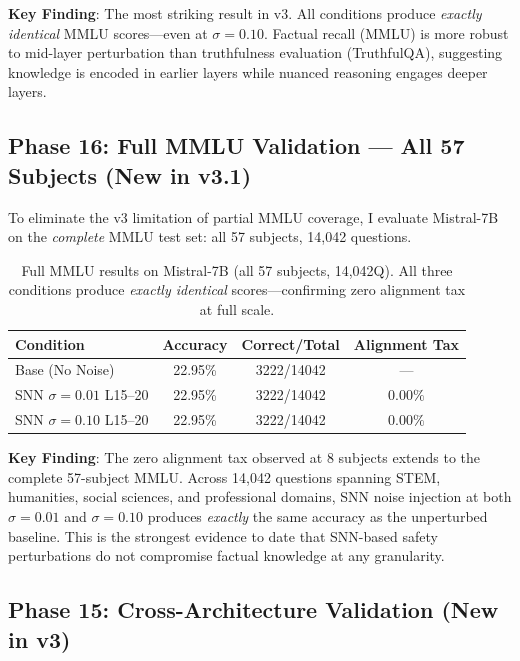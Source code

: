 \documentclass[11pt,a4paper]{article}
\begin{document}
\textbf{Key Finding}: The most striking result in v3. All conditions produce \emph{exactly identical} MMLU scores---even at $\sigma=0.10$. Factual recall (MMLU) is more robust to mid-layer perturbation than truthfulness evaluation (TruthfulQA), suggesting knowledge is encoded in earlier layers while nuanced reasoning engages deeper layers.

\subsection{Phase 16: Full MMLU Validation --- All 57 Subjects (New in v3.1)}

To eliminate the v3 limitation of partial MMLU coverage, I evaluate Mistral-7B on the \emph{complete} MMLU test set: all 57 subjects, 14,042 questions.

\begin{table}[h]
\centering
\begin{tabular}{l|ccc}
\toprule
Condition & Accuracy & Correct/Total & Alignment Tax \\
\midrule
Base (No Noise) & 22.95\% & 3222/14042 & --- \\
SNN $\sigma=0.01$ L15--20 & 22.95\% & 3222/14042 & $\mathbf{0.00\%}$ \\
SNN $\sigma=0.10$ L15--20 & 22.95\% & 3222/14042 & $\mathbf{0.00\%}$ \\
\bottomrule
\end{tabular}
\caption{Full MMLU results on Mistral-7B (all 57 subjects, 14,042Q). All three conditions produce \emph{exactly identical} scores---confirming zero alignment tax at full scale.}
\label{tab:mmlu_full}
\end{table}

\textbf{Key Finding}: The zero alignment tax observed at 8 subjects extends to the complete 57-subject MMLU. Across 14,042 questions spanning STEM, humanities, social sciences, and professional domains, SNN noise injection at both $\sigma=0.01$ and $\sigma=0.10$ produces \emph{exactly} the same accuracy as the unperturbed baseline. This is the strongest evidence to date that SNN-based safety perturbations do not compromise factual knowledge at any granularity.

\subsection{Phase 15: Cross-Architecture Validation (New in v3)}
\end{document}
